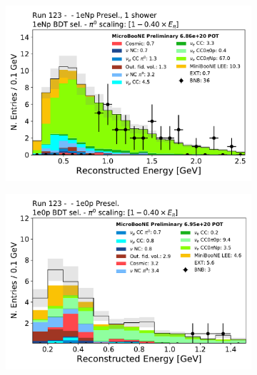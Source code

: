 \begin{figure}[ht] 
\begin{center}
    \begin{subfigure}[b]{0.28\textwidth}
    \centering
    \includegraphics[width=1.00\textwidth]{Sidebands/Figures/1eNp/HighEnergy/reco_e.pdf}
    \caption{\label{fig:intro:nueselections:1eNp}\npsel}
    \end{subfigure}
    \begin{subfigure}[b]{0.28\textwidth}
    \centering
    \includegraphics[width=1.00\textwidth]{introduction/reco_e_1e0p_08052020.pdf}
    \caption{\label{fig:intro:nueselections:1e0p}\zpsel}
    \end{subfigure}
    \begin{subfigure}[b]{0.31\textwidth}
    \centering

\end{subfigure}
\end{center}
\end{figure}
